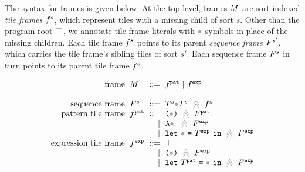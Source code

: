 The syntax for frames is given below.
At the top level, frames $M$ are sort-indexed \emph{tile frames}
$f^s$, which represent tiles with a missing child of
sort $s$.
Other than the program root $\froot$, we annotate tile frame literals
with $\framehole$ symbols in place of the missing children.
Each tile frame $f^s$ points to its parent
\emph{sequence frame} $F^{s'}$, which carries the tile frame's
sibling tiles of sort $s'$.
Each sequence frame $F^s$ in turn points to its parent
tile frame $f^s$.

\[\arraycolsep=3pt\begin{array}{rlrl}
  \text{frame} & \zframe & ::= & \tfrelem^{\pat} ~\vert~ \tfrelem^{\expr} \\\\
  \text{sequence frame} & \tframe^s & ::= & \tframelit{\tiles^s\framehole\tiles^s}{\tfrelem^s} \\
  \text{pattern tile frame} & \tfrelem^{\pat} & ::= &
    \tframelit{\sparen{\framehole}}{\tframe^{\pat}} \\
  & & \vert &
    \tframelit{\tlam{\framehole}}{\tframe^{\expr}} \\
  & & \vert &
    \tframelit{\tlet{\framehole}{\tiles^{\expr}}}{\tframe^{\expr}} \\
  \text{expression tile frame} & \tfrelem^{\expr} & ::= &
    \froot \\
  & & \vert &
    \tframelit{\sparen{\framehole}}{\tframe^{\expr}} \\
  & & \vert &
    \tframelit{\tlet{\tiles^{\pat}}{\framehole}}{\tframe^{\expr}}
\end{array}\]



